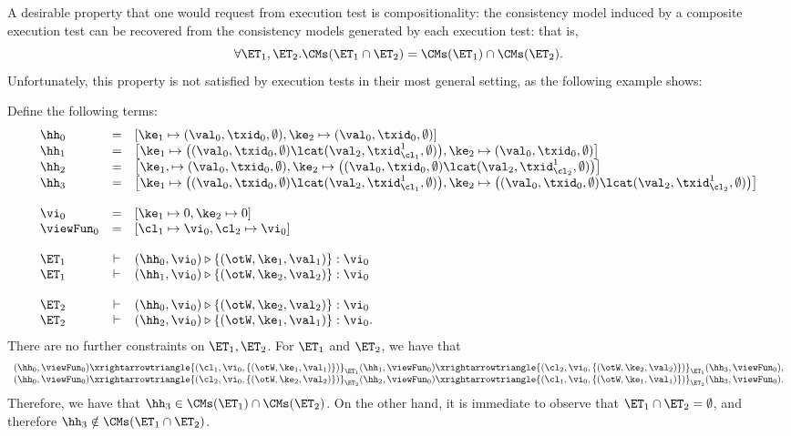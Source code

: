 A desirable property that one would request from execution 
test is compositionality: the consistency model induced by 
a composite execution test can be recovered from the consistency 
models generated by each execution test: that is, 
\[ 
\forall \ET_1, \ET_2. \CMs(\ET_1 \cap \ET_2) = \CMs(\ET_1) \cap \CMs(\ET_2).
\]
Unfortunately, this property is not satisfied by execution tests in their 
most general setting, as the following example shows: 
\begin{example}
\label{ex:noncompositional.et}
Define the following terms: 
\[
\begin{array}{lcl}
\hh_0 &=& [\ke_1 \mapsto (\val_0, \txid_0, \emptyset) , \ke_2 \mapsto (\val_0, \txid_0, \emptyset)]\\
\hh_1 &=& \big[\ke_1 \mapsto \big( (\val_0, \txid_0, \emptyset) \lcat (\val_2, \txid_{\cl_1}^{1}, \emptyset)\big) , \ke_2 \mapsto (\val_0, \txid_0, \emptyset) \big]\\
\hh_2 &=& \big[\ke_1, \mapsto (\val_0, \txid_0, \emptyset), \ke_2 \mapsto \big( (\val_0, \txid_0, \emptyset) \lcat (\val_2, \txid_{\cl_2}^{1}, \emptyset) \big) \big]\\
\hh_3 &=& \big[\ke_1 \mapsto \big( (\val_0, \txid_0, \emptyset) \lcat (\val_2, \txid_{\cl_1}^{1}, \emptyset)\big), 
                         \ke_2 \mapsto \big( (\val_0, \txid_0, \emptyset) \lcat (\val_2, \txid_{\cl_2}^{1}, \emptyset) \big) \big]\\
&&\\
\vi_0 &=& [\ke_1 \mapsto 0, \ke_2 \mapsto 0]\\
\viewFun_0 &=& [\cl_1 \mapsto \vi_0, \cl_2 \mapsto \vi_0]\\
&&\\
\ET_1 &\vdash& (\hh_0, \vi_0) \triangleright \{(\otW, \ke_1, \val_1)\} : \vi_0\\
\ET_1 &\vdash& (\hh_1, \vi_0) \triangleright \{(\otW, \ke_2, \val_2)\} : \vi_0\\
&&\\
\ET_2 &\vdash& (\hh_0, \vi_0) \triangleright \{(\otW, \ke_2, \val_2)\} : \vi_0\\
\ET_2 &\vdash& (\hh_2, \vi_0) \triangleright \{(\otW, \ke_1, \val_1)\} : \vi_0.
\end{array}
\]
There are no further constraints on $\ET_1, \ET_2$.
For $\ET_1$ and $\ET_2$, we have that 
\[
\begin{array}{l}
(\hh_0, \viewFun_0) \xrightarrowtriangle{(\cl_1, \vi_0, \{(\otW, \ke_1, \val_1)\})}_{\ET_1} 
(\hh_1, \viewFun_0) \xrightarrowtriangle{(\cl_2, \vi_0, \{(\otW, \ke_2, \val_2)\})}_{\ET_1} (\hh_3, \viewFun_0), \\
(\hh_0, \viewFun_0) \xrightarrowtriangle{(\cl_2, \vi_0, \{(\otW, \ke_2, \val_2)\})}_{\ET_2} 
(\hh_2, \viewFun_0) \xrightarrowtriangle{(\cl_1, \vi_0, \{(\otW, \ke_1, \val_1)\})}_{\ET_2} (\hh_3, \viewFun_0).\\
\end{array}
\] 
Therefore, we have that $\hh_3 \in \CMs(\ET_1) \cap \CMs(\ET_2)$. On the other hand, it is immediate 
to observe that $\ET_1 \cap \ET_2 = \emptyset$, and therefore $\hh_3 \notin \CMs(\ET_1 \cap \ET_2)$.
\end{example}
